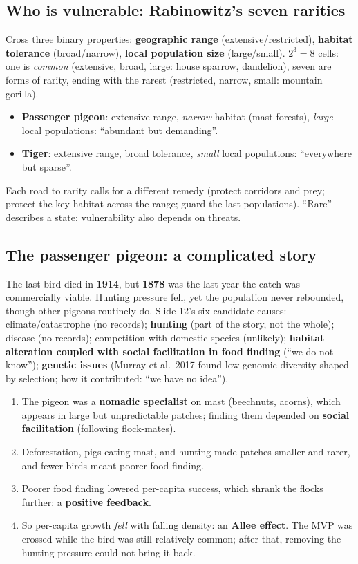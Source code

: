 \subsection{Who is vulnerable: Rabinowitz's seven rarities}
Cross three binary properties: \textbf{geographic range} (extensive/restricted), \textbf{habitat tolerance}
(broad/narrow), \textbf{local population size} (large/small). $2^3=8$ cells: one is \emph{common} (extensive, broad, large:
house sparrow, dandelion), seven are forms of rarity, ending with the rarest (restricted, narrow, small: mountain
gorilla).
\begin{itemize}
\item \textbf{Passenger pigeon}: extensive range, \emph{narrow} habitat (mast forests), \emph{large} local populations:
``abundant but demanding''.
\item \textbf{Tiger}: extensive range, broad tolerance, \emph{small} local populations: ``everywhere but sparse''.
\end{itemize}
Each road to rarity calls for a different remedy (protect corridors and prey; protect the key habitat across the range;
guard the last populations). ``Rare'' describes a state; vulnerability also depends on threats.

\subsection{The passenger pigeon: a complicated story}
The last bird died in \textbf{1914}, but \textbf{1878} was the last year the catch was commercially viable. Hunting
pressure fell, yet the population never rebounded, though other pigeons routinely do. Slide 12's six candidate causes:
climate/catastrophe (no records); \textbf{hunting} (part of the story, not the whole); disease (no records);
competition with domestic species (unlikely); \textbf{habitat alteration coupled with social facilitation in food
finding} (``we do not know''); \textbf{genetic issues} (Murray et al.\ 2017 found low genomic diversity shaped by
selection; how it contributed: ``we have no idea'').

\begin{chain}
\begin{enumerate}
\item The pigeon was a \textbf{nomadic specialist} on mast (beechnuts, acorns), which appears in large but unpredictable
patches; finding them depended on \textbf{social facilitation} (following flock-mates).
\item Deforestation, pigs eating mast, and hunting made patches smaller and rarer, and fewer birds meant poorer
food finding.
\item Poorer food finding lowered per-capita success, which shrank the flocks further: a \textbf{positive feedback}.
\item So per-capita growth \emph{fell} with falling density: an \textbf{Allee effect}. The MVP was crossed while the bird
was still relatively common; after that, removing the hunting pressure could not bring it back.
\end{enumerate}
\end{chain}

